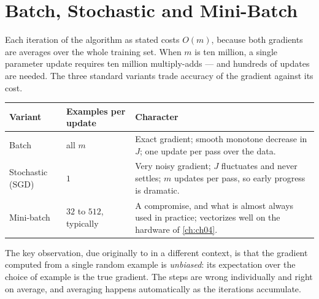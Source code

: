 \section{Batch, Stochastic and Mini-Batch}
\label{sec:sgd}

Each iteration of the algorithm as stated costs $O(m)$, because both gradients
are averages over the whole training set. When $m$ is ten million, a single
parameter update requires ten million multiply-adds --- and hundreds of updates
are needed. The three standard variants trade accuracy of the gradient against
its cost.

\begin{center}
\small
\renewcommand{\arraystretch}{1.25}
\begin{tabular}{@{}L{2.6cm}L{2.9cm}L{5.3cm}@{}}
\toprule
\textbf{Variant} & \textbf{Examples per update} & \textbf{Character}\\
\midrule
Batch & all $m$ &
  Exact gradient; smooth monotone decrease in $J$; one update per pass over the
  data.\\
Stochastic (SGD) & $1$ &
  Very noisy gradient; $J$ fluctuates and never settles; $m$ updates per pass,
  so early progress is dramatic.\\
Mini-batch & $32$ to $512$, typically &
  A compromise, and what is almost always used in practice; vectorizes well on
  the hardware of \cref{ch:ch04}.\\
\bottomrule
\end{tabular}
\end{center}

The key observation, due originally to \textcite{robbins1951} in a different
context, is that the gradient computed from a single random example is
\emph{unbiased}: its expectation over the choice of example is the true
gradient. The steps are wrong individually and right on average, and averaging
happens automatically as the iterations accumulate.

